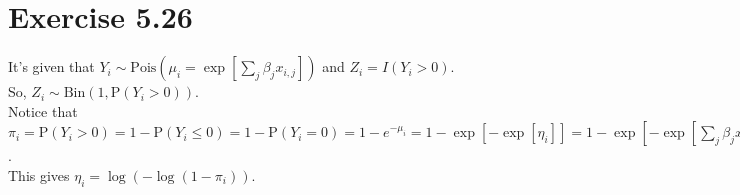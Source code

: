 \section*{Exercise 5.26}
It's given that $Y_{i} \sim \mathrm{Pois}\left(\mu_{i} = \exp\left[\sum_{j}\beta_{j}x_{i,j}\right]\right)$ and $Z_{i} = I(Y_{i} > 0)$.\\
So, $Z_{i} \sim \mathrm{Bin}\left(1,\mathrm{P}(Y_{i} > 0)\right)$.\\
Notice that
$\pi_{i} = \mathrm{P}(Y_{i} > 0) = 1 - \mathrm{P}(Y_{i} \leq 0) = 1 - \mathrm{P}(Y_{i} = 0) = 1 -e^{-\mu_{i}} = 1-\exp\left[-\exp\left[\eta_{i}\right]\right] = 1-\exp\left[-\exp\left[\sum_{j}\beta_{j}x_{i,j}\right]\right]$.\\

This gives $\eta_{i} = \log\left(-\log\left(1-\pi_{i}\right)\right)$.

